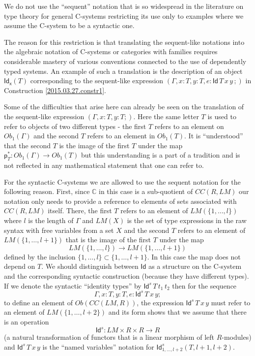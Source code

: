\documentclass[12pt]{article}
\numberwithin{equation}{section}
\newcommand{\sr}{\rightarrow}
\newcommand{\toCC}{CC} %
\newcommand{\aCC}{{\mathbb C}}  %
\newcommand{\p}{\mathsf{p}}
\newcommand{\Id}{\mathsf{Id}} %
\newcommand{\Idx}{\mathsf{Id_x}} %
\begin{document}
We do not use the ``sequent'' notation that is so widespread in the literature
on type theory for general C-systems restricting its use only to examples where
we assume the C-system to be a syntactic one.

The reason for this restriction is that translating the sequent-like notations
into the algebraic notation of C-systems or categories with families requires
considerable mastery of various conventions connected to the use of dependently
typed systems. An example of such a translation is the description of an object
$\Idx(T)$ corresponding to the sequent-like expression
$(\Gamma, x:T, y:T, e:\Id\, T\, x\, y\,;)$ in Construction \ref{2015.03.27.constr1}.

Some of the difficulties that arise here can already be seen on the translation
of the sequent-like expression $(\Gamma, x:T, y:T;)$. Here the same letter $T$
is used to refer to objects of two different types - the first $T$ refers to an
element on $Ob_1(\Gamma)$ and the second $T$ refers to an element in
$Ob_1(T)$. It is ``understood'' that the second $T$ is the image of the first
$T$ under the map $\p_T^*:Ob_1(\Gamma)\sr Ob_1(T)$ but this understanding is a
part of a tradition and is not reflected in any mathematical statement that one
can refer to.

For the syntactic C-systems we are allowed to use the sequent notation for the
following reason. First, since $\aCC$ in this case is a sub-quotient of
$\toCC(R,LM)$ our notation only needs to provide a reference to elements of sets
associated with $\toCC(R,LM)$ itself.  There, the first $T$ refers to an element
of $LM(\{1,\dots,l\})$ where $l$ is the length of $\Gamma$ and $LM(X)$ is the
set of type expressions in the raw syntax with free variables from a set $X$
and the second $T$ refers to an element of $LM(\{1,\dots,l+1\})$ that is the
image of the first $T$ under the map
%
$$LM(\{1,\dots,l\})\sr LM(\{1,\dots,l+1\})$$
%
defined by the inclusion $\{1,\dots,l\}\subset \{1,\dots,l+1\}$. In this case
the map does not depend on $T$. We should distinguish between $\Id$ as a
structure on the C-system and the corresponding syntactic construction (because
they have different types). If we denote the syntactic ``identity types'' by
$\Id^s\, T\, t_1\, t_2$ then for the sequence
%
$$\Gamma, x:T, y:T, e:\Id^s\,T\,x\,y;$$
%
to define an element of $Ob(\toCC(LM,R))$, the expression $\Id^s\,T\,x\,y$ must
refer to an element of $LM(\{1,\dots,l+2\})$ and its form shows that we assume
that there is an operation
%
$$\Id^s:LM\times R\times R\sr R$$
%
(a natural transformation of functors that is a linear morphism of left
$R$-modules) and $\Id^s\,T\,x\,y$ is the ``named variables'' notation for
$\Id^s_{{1,\dots,l+2}}(T,l+1,l+2)$.
\end{document}
